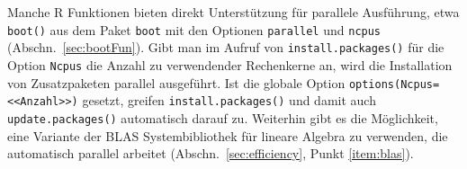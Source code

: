 \label{page:par_instpack}
Manche R Funktionen bieten direkt Unterstützung für parallele Ausführung, etwa \lstinline!boot()! aus dem Paket \lstinline!boot! mit den Optionen \lstinline!parallel! und \lstinline!ncpus! (Abschn.\ \ref{sec:bootFun}). Gibt man im Aufruf von \lstinline!install.packages()! für die Option \lstinline!Ncpus! die Anzahl zu verwendender Rechenkerne an, wird die Installation von Zusatzpaketen parallel ausgeführt. Ist die globale Option \lstinline!options(Ncpus=<<Anzahl>>)! gesetzt, greifen \lstinline!install.packages()! und damit auch \lstinline!update.packages()! automatisch darauf zu. Weiterhin gibt es die Möglichkeit, eine Variante der BLAS Systembibliothek für lineare Algebra zu verwenden, die automatisch parallel arbeitet (Abschn.\ \ref{sec:efficiency}, Punkt \ref{item:blas}).
